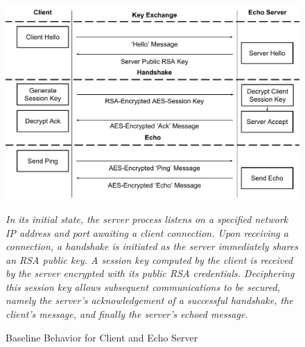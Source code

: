 \documentclass[sigconf]{acmart}
\theoremstyle{plain}
\theoremstyle{remark}
\begin{document}
\begin{figure}[]
\centering
\includegraphics[width=1\columnwidth]{figures/ProcessInteractions.pdf}
\caption{Baseline Behavior for Client and Echo Server}
\textit{In its initial state, the server process listens on a specified network IP address and port awaiting a client connection. Upon receiving a connection, a handshake is initiated as the server immediately shares an RSA public key. A session key computed by the client is received by the server encrypted with its public RSA credentials. Deciphering this session key allows subsequent communications to be secured, namely the server's acknowledgement of a successful handshake, the client's message, and finally the server's echoed message.} %
\label{fig:ProcessInteractions}
\end{figure}


\end{document}

